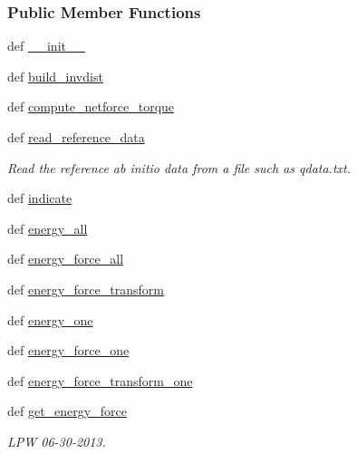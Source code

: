 \subsubsection*{Public Member Functions}
\begin{DoxyCompactItemize}
\item 
def \hyperlink{classforcebalance_1_1gmxio_1_1AbInitio__GMX_a1d03ae8104bcecacf96884058f2698af}{\-\_\-\-\_\-init\-\_\-\-\_\-}
\item 
def \hyperlink{classforcebalance_1_1abinitio_1_1AbInitio_a7475857193eefd4edd020d4f2a8fec17}{build\-\_\-invdist}
\item 
def \hyperlink{classforcebalance_1_1abinitio_1_1AbInitio_afbf86c26158a68cae7460b4106809fdd}{compute\-\_\-netforce\-\_\-torque}
\item 
def \hyperlink{classforcebalance_1_1abinitio_1_1AbInitio_aa73bedbf1e2cf19f2fa1e88815f1bd86}{read\-\_\-reference\-\_\-data}
\begin{DoxyCompactList}\small\item\em Read the reference ab initio data from a file such as qdata.\-txt. \end{DoxyCompactList}\item 
def \hyperlink{classforcebalance_1_1abinitio_1_1AbInitio_a3260db78e8c174f04a64661c4e5c181c}{indicate}
\item 
def \hyperlink{classforcebalance_1_1abinitio_1_1AbInitio_a99cca2d0bcbb382fcf7069907e74639f}{energy\-\_\-all}
\item 
def \hyperlink{classforcebalance_1_1abinitio_1_1AbInitio_acffb00d0edc291791eafb8a2d63ab3a1}{energy\-\_\-force\-\_\-all}
\item 
def \hyperlink{classforcebalance_1_1abinitio_1_1AbInitio_afdcc0b598565afa1b1456f78f87cc1be}{energy\-\_\-force\-\_\-transform}
\item 
def \hyperlink{classforcebalance_1_1abinitio_1_1AbInitio_aa91a79773331fdf845ab34e54ce99d47}{energy\-\_\-one}
\item 
def \hyperlink{classforcebalance_1_1abinitio_1_1AbInitio_a157be30ae6d556e17d8af30cefe393f4}{energy\-\_\-force\-\_\-one}
\item 
def \hyperlink{classforcebalance_1_1abinitio_1_1AbInitio_a961c909cf811a710095b091917c57d95}{energy\-\_\-force\-\_\-transform\-\_\-one}
\item 
def \hyperlink{classforcebalance_1_1abinitio_1_1AbInitio_ace85b4ad9266a96d16e39a4c6b440b7f}{get\-\_\-energy\-\_\-force}
\begin{DoxyCompactList}\small\item\em L\-P\-W 06-\/30-\/2013. \end{DoxyCompactList}\item 

\end{DoxyCompactItemize}
